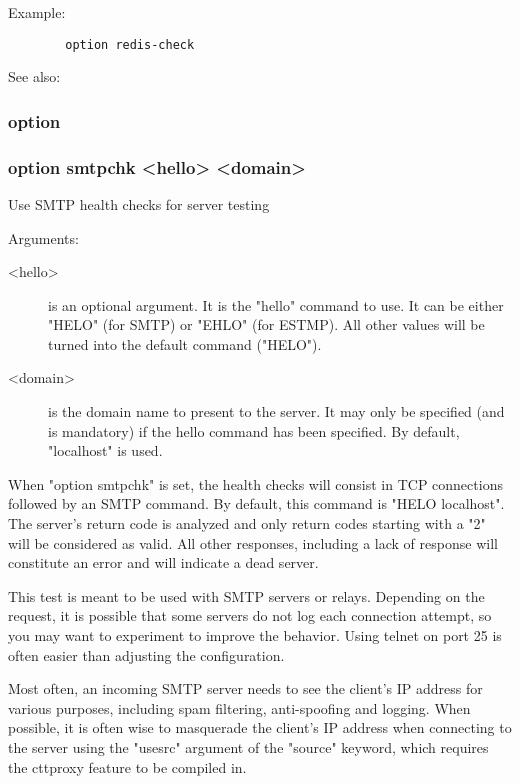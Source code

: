 {  Example:
\begin{verbatim}
        option redis-check
\end{verbatim}

  See also: 

\subsubsection[smtpchk]{option }
\subsubsection*{option smtpchk <hello> <domain>}

  Use SMTP health checks for server testing


  Arguments:
  
\begin{description}
\item[<hello>]   is an optional argument. It is the "hello" command to use. It can
              be either "HELO" (for SMTP) or "EHLO" (for ESTMP). All other
              values will be turned into the default command ("HELO").

\item[<domain>] is the domain name to present to the server. It may only be
              specified (and is mandatory) if the hello command has been
              specified. By default, "localhost" is used.
\end{description}

  When "option smtpchk" is set, the health checks will consist in TCP
  connections followed by an SMTP command. By default, this command is
  "HELO localhost". The server's return code is analyzed and only return codes
  starting with a "2" will be considered as valid. All other responses,
  including a lack of response will constitute an error and will indicate a
  dead server.

  This test is meant to be used with SMTP servers or relays. Depending on the
  request, it is possible that some servers do not log each connection attempt,
  so you may want to experiment to improve the behavior. Using telnet on port
  25 is often easier than adjusting the configuration.

  Most often, an incoming SMTP server needs to see the client's IP address for
  various purposes, including spam filtering, anti-spoofing and logging. When
  possible, it is often wise to masquerade the client's IP address when
  connecting to the server using the "usesrc" argument of the "source" keyword,
  which requires the cttproxy feature to be compiled in.

}
